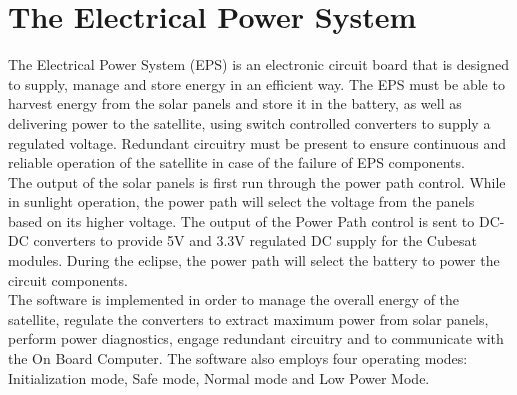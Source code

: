 \justifying
\chapter{The Electrical Power System}
The Electrical Power System (EPS) is an electronic circuit board that is designed
to supply, manage and store energy in an efficient way. The EPS must be
able to harvest energy from the solar panels and store it in the battery, as well as
delivering power to the satellite, using switch controlled converters to supply a
regulated voltage. Redundant circuitry must be present to ensure continuous and reliable operation of the satellite in case of the failure of EPS components.
\\

The output of the solar panels is first run through the power path control. While in
sunlight operation, the power path will select the voltage from the panels based on
its higher voltage. The output of the Power Path control is sent to DC-DC converters to provide 5V and 3.3V regulated DC supply for the Cubesat modules. During the eclipse, the power path will select the battery to power the circuit components.
\\
The software is implemented in order to manage the overall energy of the satellite,
regulate the converters to extract maximum power from solar panels, perform
power diagnostics, engage redundant circuitry and to communicate with the On
Board Computer. The software also employs four operating modes: Initialization
mode, Safe mode, Normal mode and Low Power Mode.
\\

